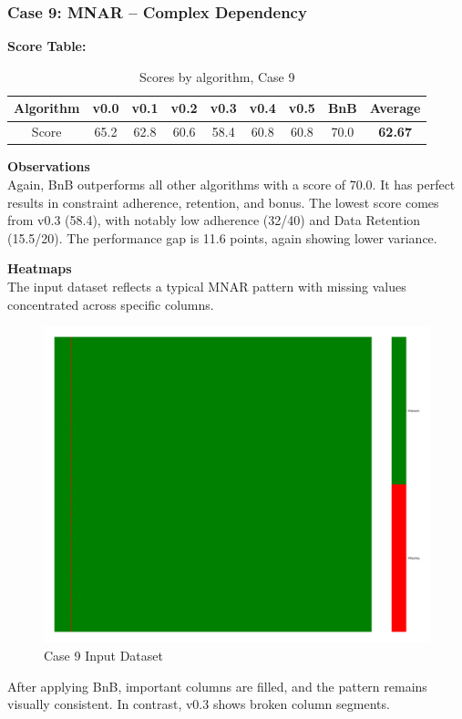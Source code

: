 \documentclass[a4paper,12pt]{article}
\begin{document}
\subsubsection{Case 9: MNAR – Complex Dependency}

\textbf{Score Table:}

\begin{table}[H]
\centering
\caption{Scores by algorithm, Case 9}
\label{tab:score_algorithms_case9}
\begin{tabular}{|c|c|c|c|c|c|c|c|c|}
\hline
Algorithm & v0.0 & v0.1 & v0.2 & v0.3 & v0.4 & v0.5 & BnB & Average \\
\hline
Score & 65.2 & 62.8 & 60.6 & 58.4 & 60.8 & 60.8 & 70.0 & \textbf{62.67}  \\
\hline
\end{tabular}
\end{table}

\textbf{Observations}\\
Again, BnB outperforms all other algorithms with a score of 70.0. It has perfect results in constraint adherence, retention, and bonus. The lowest score comes from v0.3 (58.4), with notably low adherence (32/40) and Data Retention (15.5/20). The performance gap is 11.6 points, again showing lower variance. 

\textbf{Heatmaps}\\
The input dataset reflects a typical MNAR pattern with missing values concentrated across specific columns.

\begin{figure}[H]
    \centering
    \includegraphics[width=0.5\linewidth]{case10_heatmap_erased.png}
    \caption{Case 9 Input Dataset}
\end{figure}

After applying BnB, important columns are filled, and the pattern remains visually consistent. In contrast, v0.3 shows broken column segments.
\end{document}
